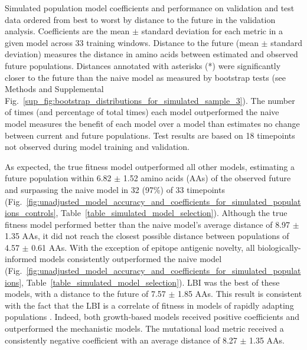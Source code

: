 \begin{table}[htb]
  \begin{center}
    \scalebox{0.9}{
      
    }
    \caption{
      Simulated population model coefficients and performance on validation and test data ordered from best to worst by distance to the future in the validation analysis.
      Coefficients are the mean $\pm$ standard deviation for each metric in a given model across 33 training windows.
      Distance to the future (mean $\pm$ standard deviation) measures the distance in amino acids between estimated and observed future populations.
      Distances annotated with asterisks (*) were significantly closer to the future than the naive model as measured by bootstrap tests (see Methods and Supplemental Fig.~\ref{sup_fig:bootstrap_distributions_for_simulated_sample_3}).
      The number of times (and percentage of total times) each model outperformed the naive model measures the benefit of each model over a model than estimates no change between current and future populations.
      Test results are based on 18 timepoints not observed during model training and validation.
    }
    \label{table_simulated_model_selection}
  \end{center}
\end{table}

As expected, the true fitness model outperformed all other models, estimating a future population within 6.82 $\pm$ 1.52 amino acids (AAs) of the observed future and surpassing the naive model in 32 (97\%) of 33 timepoints (Fig.~\ref{fig:unadjusted_model_accuracy_and_coefficients_for_simulated_populations_controls}, Table~\ref{table_simulated_model_selection}).
Although the true fitness model performed better than the naive model's average distance of 8.97 $\pm$ 1.35 AAs, it did not reach the closest possible distance between populations of 4.57 $\pm$ 0.61 AAs.
With the exception of epitope antigenic novelty, all biologically-informed models consistently outperformed the naive model (Fig.~\ref{fig:unadjusted_model_accuracy_and_coefficients_for_simulated_populations}, Table~\ref{table_simulated_model_selection}).
LBI was the best of these models, with a distance to the future of 7.57 $\pm$ 1.85 AAs.
This result is consistent with the fact that the LBI is a correlate of fitness in models of rapidly adapting populations \cite{Neher:2014eu}.
Indeed, both growth-based models received positive coefficients and outperformed the mechanistic models.
The mutational load metric received a consistently negative coefficient with an average distance of 8.27 $\pm$ 1.35 AAs.

